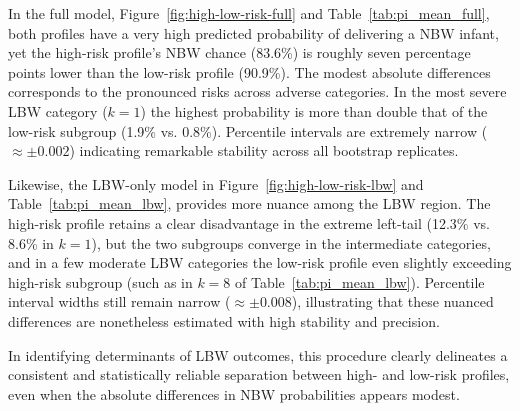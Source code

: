 In the full model, Figure~\ref{fig:high-low-risk-full} and Table~\ref{tab:pi_mean_full}, both profiles have a very high predicted probability of delivering a NBW infant, yet the high-risk profile’s NBW chance (83.6\%) is roughly seven percentage points lower than the low-risk profile (90.9\%). The modest absolute differences corresponds to the pronounced risks across adverse categories. In the most severe LBW category (\(k=1\)) the highest probability is more than double that of the low-risk subgroup (1.9\% vs. 0.8\%). Percentile intervals are extremely narrow (\(\approx \pm 0.002\)) indicating remarkable stability across all bootstrap replicates. 

Likewise, the LBW-only model in Figure~\ref{fig:high-low-risk-lbw} and Table~\ref{tab:pi_mean_lbw}, provides more nuance among the LBW region. The high-risk profile retains a clear disadvantage in the extreme left-tail (12.3\% vs. 8.6\% in \(k=1\)), but the two subgroups converge in the intermediate categories, and in a few moderate LBW categories the low-risk profile even slightly exceeding high-risk subgroup (such as in \(k=8\) of Table~\ref{tab:pi_mean_lbw}). Percentile interval widths still remain narrow (\(\approx \pm 0.008\)), illustrating that these nuanced differences are nonetheless estimated with high stability and precision. 

In identifying determinants of LBW outcomes, this procedure clearly delineates a consistent and statistically reliable separation between high- and low-risk profiles, even when the absolute differences in NBW probabilities appears modest.

\newpage
